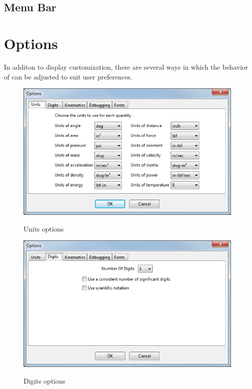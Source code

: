 \subsection{Menu Bar} \label{ssec:menuBar}



\section{Options} \label{sec:options}

In additon to display customization, there are several ways in which the behavior of \vvase{} can be adjusted to suit user preferences.

\begin{figure}
\includegraphics[width=\textwidth]{images/optionsUnits} \label{fig:optionsUnits}
\caption{Units options}
\centering
\end{figure}

\begin{figure}
\includegraphics[width=\textwidth]{images/optionsDigits} \label{fig:optionsDigits}
\caption{Digits options}
\centering
\end{figure}

